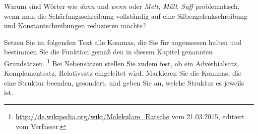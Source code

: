 \Uebungen

\Uebung[\tristar] \label{u151} Warum sind Wörter wie \textit{dann} und \textit{wenn} oder \textit{Mett}, \textit{Müll}, \textit{Suff} problematisch, wenn man die Schärfungsschreibung vollständig auf eine Silbengelenkschreibung und Konstantschreibungen reduzieren möchte?

\Uebung \label{u153} Setzen Sie im folgenden Text alle Kommas, die Sie für angemessen halten und bestimmen Sie die Funktion gemäß den in diesem Kapitel genannten Grundsätzen.%
\footnote{\url{http://de.wikipedia.org/wiki/Molekulare_Ratsche} vom 21.03.2015, editiert vom Verfasser.}
Bei Nebensätzen stellen Sie zudem fest, ob ein Adverbialsatz, Komplementsatz, Relativsatz eingeleitet wird.
Markieren Sie die Kommas, die eine Struktur beenden, gesondert, und geben Sie an, welche Struktur es jeweils ist.

